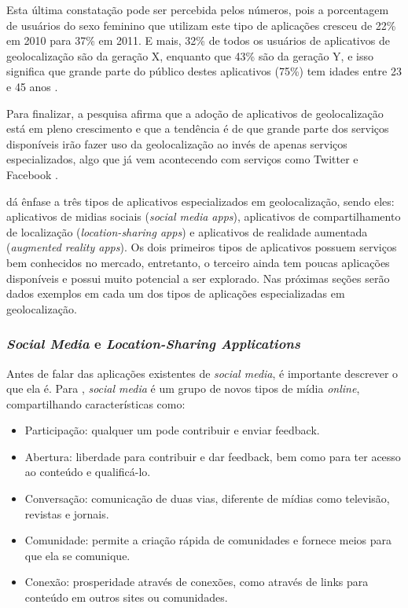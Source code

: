 \documentclass[diss]{template/setrem}
\begin{document}
Esta última constatação pode ser percebida pelos números, pois a porcentagem de usuários do sexo feminino que utilizam este tipo de aplicações cresceu de 22\% em 2010 para 37\% em 2011. E mais, 32\% de todos os usuários de aplicativos de geolocalização são da geração X, enquanto que 43\% são da geração Y, e isso significa que grande parte do público destes aplicativos (75\%) tem idades entre 23 e 45 anos \citep{Grove2011}.

Para finalizar, a pesquisa afirma que a adoção de aplicativos de geolocalização está em pleno crescimento e que a tendência é de que grande parte dos serviços disponíveis irão fazer uso da geolocalização ao invés de apenas serviços especializados, algo que já vem acontecendo com serviços como Twitter e Facebook \citep{Grove2011}.

\citet{Holdener2011} dá ênfase a três tipos de aplicativos especializados em geolocalização, sendo eles: aplicativos de midias sociais (\emph{social media apps}), aplicativos de compartilhamento de localização (\emph{location-sharing apps}) e aplicativos de realidade aumentada (\emph{augmented reality apps}). Os dois primeiros tipos de aplicativos possuem serviços bem conhecidos no mercado, entretanto, o terceiro ainda tem poucas aplicações disponíveis e possui muito potencial a ser explorado. Nas próximas seções serão dados exemplos em cada um dos tipos de aplicações especializadas em geolocalização.

\subsubsection{\textit{Social Media} e \textit{Location-Sharing Applications}}
\label{subsubsec:socialmedia}
Antes de falar das aplicações existentes de \emph{social media}, é importante descrever o que ela é. Para \citet{Mayfield2008}, \emph{social media} é um grupo de novos tipos de mídia \emph{online}, compartilhando características como:
\begin{itemize}
   	\item Participação: qualquer um pode contribuir e enviar feedback.
   	\item Abertura: liberdade para contribuir e dar feedback, bem como para ter acesso ao conteúdo e qualificá-lo.
   	\item Conversação: comunicação de duas vias, diferente de mídias como televisão, revistas e jornais.
   	\item Comunidade: permite a criação rápida de comunidades e fornece meios para que ela se comunique.
   	\item Conexão: prosperidade através de conexões, como através de links para conteúdo em outros sites ou comunidades.
\end{itemize}
\end{document}
